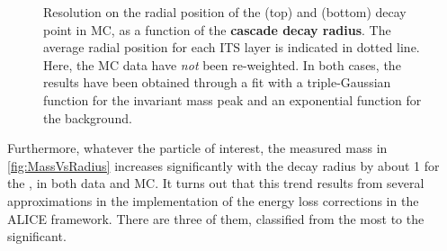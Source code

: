 \begin{figure}[t]
\hspace*{-2.cm}
\caption{Resolution on the radial position of the \rmXi (top) and \rmOmega (bottom) decay point in MC, as a function of the \textbf{cascade decay radius}. The average radial position for each ITS layer is indicated in dotted line. Here, the MC data have \textit{not} been re-weighted. In both cases, the results have been obtained through a fit with a triple-Gaussian function for the invariant mass peak and an exponential function for the background.}
	\label{fig:RadiusResolVsRadius}
\end{figure}

Furthermore, whatever the particle of interest, the measured mass in \fig\ref{fig:MassVsRadius} increases significantly with the decay radius by about 1 \mmass for the \rmXi, in both data and MC. It turns out that this trend results from several approximations in the implementation of the energy loss corrections in the ALICE framework. There are three of them, classified from the most to the  significant.

